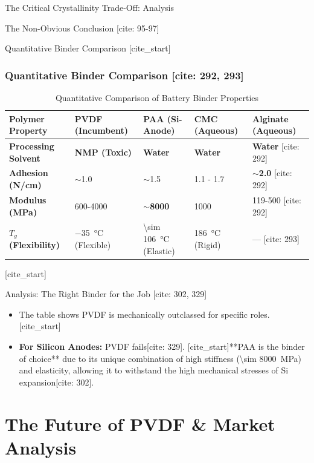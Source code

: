 \documentclass[aspectratio=169]{beamer}
\begin{document}
\begin{frame}{The Critical Crystallinity Trade-Off: Analysis}
\begin{alertblock}{The Non-Obvious Conclusion [cite: 95-97]}
\begin{frame}{Quantitative Binder Comparison}
    [cite_start]\frametitle{Quantitative Binder Comparison [cite: 292, 293]}
    \begin{table}
        \centering
        \small
        \caption{Quantitative Comparison of Battery Binder Properties}
        \begin{tabular}{l l l l l}
            \toprule
            \textbf{Polymer Property} & \textbf{PVDF (Incumbent)} & \textbf{PAA (Si-Anode)} & \textbf{CMC (Aqueous)} & \textbf{Alginate (Aqueous)} \\
            \midrule
            [cite_start]\textbf{Processing Solvent} & \textbf{NMP (Toxic)} & \textbf{Water} & \textbf{Water} & \textbf{Water} [cite: 292] \\
            [cite_start]\textbf{Adhesion (N/cm)} & \(\sim\)1.0 & \(\sim\)1.5 & 1.1 - 1.7 & \textbf{\(\sim\)2.0} [cite: 292] \\
            [cite_start]\textbf{Modulus (MPa)} & 600-4000 & \textbf{\(\sim\)8000} & 1000 & 119-500 [cite: 292] \\
            [cite_start]\textbf{$T_g$ (Flexibility)} & \SI{-35}{\celsius} (Flexible) & \SI{\sim 106}{\celsius} (Elastic) & \SI{186}{\celsius} (Rigid) & --- [cite: 293] \\
            \bottomrule
        \end{tabular}
    \end{table}
    
    [cite_start]\begin{alertblock}{Analysis: The Right Binder for the Job [cite: 302, 329]}
        \begin{itemize}
            \item The table shows PVDF is mechanically outclassed for specific roles.
            [cite_start]\item \textbf{For Silicon Anodes:} PVDF fails[cite: 329]. [cite_start]**PAA is the binder of choice** due to its unique combination of high stiffness (\SI{\sim 8000}{MPa}) and elasticity, allowing it to withstand the high mechanical stresses of Si expansion[cite: 302].
        \end{itemize}
    \end{alertblock}
\end{frame}

\section{The Future of PVDF \& Market Analysis}


\end{alertblock}
\end{frame}
\end{document}

